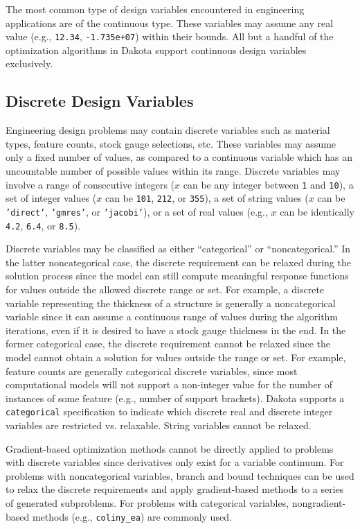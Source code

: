 The most common type of design variables encountered in engineering
applications are of the continuous type. These variables may assume
any real value (e.g., \texttt{12.34}, \texttt{-1.735e+07}) within
their bounds. All but a handful of the optimization algorithms in
Dakota support continuous design variables exclusively.

\subsection{Discrete Design Variables}\label{variables:design:ddv}

Engineering design problems may contain discrete variables such as
material types, feature counts, stock gauge selections, etc. These
variables may assume only a fixed number of values, as compared to a
continuous variable which has an uncountable number of possible values
within its range.  Discrete variables may involve a range of
consecutive integers ($x$ can be any integer between \texttt{1} and
\texttt{10}), a set of integer values ($x$ can be \texttt{101},
\texttt{212}, or \texttt{355}), a set of string values ($x$ can be
\texttt{'direct'}, \texttt{'gmres'}, or \texttt{'jacobi'}), or a set
of real values (e.g., $x$ can be identically \texttt{4.2},
\texttt{6.4}, or \texttt{8.5}).

Discrete variables may be classified as either ``categorical'' or
``noncategorical.''  In the latter noncategorical case, the discrete
requirement can be relaxed during the solution process since the model
can still compute meaningful response functions for values outside the
allowed discrete range or set. For example, a discrete variable
representing the thickness of a structure is generally a
noncategorical variable since it can assume a continuous range of
values during the algorithm iterations, even if it is desired to have
a stock gauge thickness in the end. In the former categorical case,
the discrete requirement cannot be relaxed since the model cannot
obtain a solution for values outside the range or set. For example,
feature counts are generally categorical discrete variables, since
most computational models will not support a non-integer value for the
number of instances of some feature (e.g., number of support
brackets).  Dakota supports a \texttt{categorical} specification to
indicate which discrete real and discrete integer variables are
restricted vs. relaxable.  String variables cannot be relaxed.
  
Gradient-based optimization methods cannot be directly applied to
problems with discrete variables since derivatives only exist for a
variable continuum. For problems with noncategorical variables, branch
and bound techniques can be used to relax the discrete requirements
and apply gradient-based methods to a series of generated
subproblems. For problems with categorical variables,
nongradient-based methods (e.g., \texttt{coliny\_ea}) are commonly
used. 

